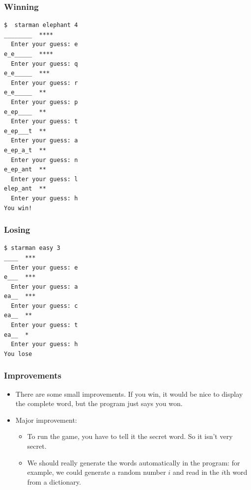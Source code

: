 \documentclass{beamer}
\begin{document}
\begin{frame}[fragile]
\frametitle{Winning}

{\footnotesize
\begin{verbatim}
$  starman elephant 4
________  ****
  Enter your guess: e
e_e_____  ****
  Enter your guess: q
e_e_____  ***
  Enter your guess: r
e_e_____  **
  Enter your guess: p
e_ep____  **
  Enter your guess: t
e_ep___t  **
  Enter your guess: a
e_ep_a_t  **
  Enter your guess: n
e_ep_ant  **
  Enter your guess: l
elep_ant  **
  Enter your guess: h
You win!
\end{verbatim}
}
\end{frame}

\begin{frame}[fragile]
\frametitle{Losing}

{\footnotesize
\begin{verbatim}
$ starman easy 3
____  ***
  Enter your guess: e
e___  ***
  Enter your guess: a
ea__  ***
  Enter your guess: c
ea__  **
  Enter your guess: t
ea__  *
  Enter your guess: h
You lose
\end{verbatim}
}
\end{frame}

\begin{frame}[fragile]
\frametitle{Improvements}

\begin{itemize}
\item There are some small improvements.  If you win, it would be
  nice to display the complete word, but the program just says you
  won.
\item Major improvement:
  \begin{itemize}
  \item To run the game, you have to tell it the secret word.  So
    it isn't very secret.
  \item We should really generate the words automatically in the
    program: for example, we could generate a random number $i$ and
    read in the $i$th word from a dictionary.
  \end{itemize}
\end{itemize}

\end{frame}



\end{document}
